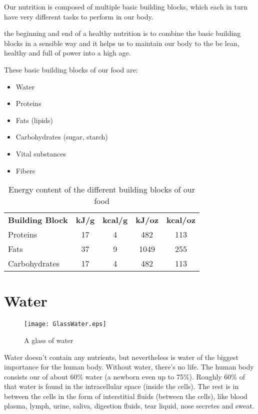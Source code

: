 \documentclass[../main.tex]{subfiles}
\begin{document}
Our nutrition is composed of multiple basic building blocks, which each in turn have very different
tasks to perform in our body.

the beginning and end of a healthy nutrition is to combine the basic building blocks in a sensible way and it helps us
to maintain our body to the be lean, healthy and full of power into a high age.

These basic building blocks of our food are:
\begin{itemize}
\item Water
\item Proteins
\item Fats (lipids)
\item Carbohydrates (sugar, starch)
\item Vital substances
\item Fibers
\end{itemize}

\begin{table}[htb!]
  \centering
  \begin{tabular}{lcccc}
    \textbf{Building Block} & \textbf{kJ/g} & \textbf{kcal/g} & \textbf{kJ/oz} & \textbf{kcal/oz} \\
    Proteins & 17 & 4 & 482 & 113 \\
    Fats & 37 & 9 & 1049 & 255 \\
    Carbohydrates & 17 & 4 & 482 & 113 \\
  \end{tabular}
  \caption{Energy content of the different building blocks of our food}
\end{table}

\section{Water}

\begin{figure}[htb!]
  \centering
\texttt{[image: GlassWater.eps]}
  \caption{A glass of water~\cite{GlassWater}}
\end{figure}



Water doesn't contain any nutrients, but nevertheless is water of the biggest importance for the human body.
Without water, there's no life.
The human body consists our of about 60\% water (a newborn even up to 75\%).
Roughly 60\% of that water is found in the intracellular space (inside the cells).
The rest is in between the cells in the form of interstitial fluids (between the cells),
like blood plasma, lymph, urine, saliva, digestion fluids, tear liquid, nose secretes and sweat.
\end{document}
